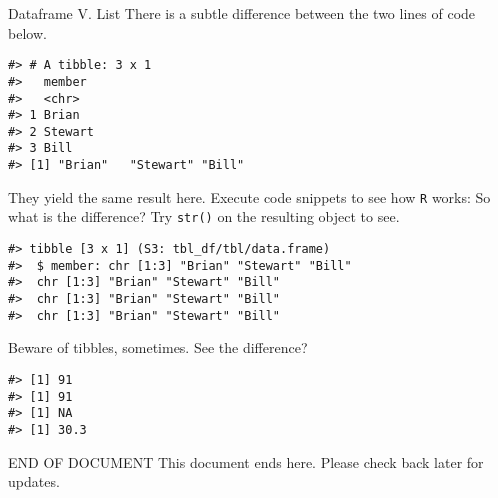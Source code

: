 \documentclass[
  11pt,
  ignorenonframetext,
  svgnames, handout, t]{beamer}
\begin{document}
\begin{frame}[fragile]{Dataframe V. List}
\protect\hypertarget{dataframe-v.-list}{}
There is a subtle difference between the two lines of code below.

\footnotesize

\begin{verbatim}
#> # A tibble: 3 x 1
#>   member 
#>   <chr>  
#> 1 Brian  
#> 2 Stewart
#> 3 Bill
#> [1] "Brian"   "Stewart" "Bill"
\end{verbatim}

\normalsize

They yield the same result here. Execute code snippets to see how
\texttt{R} works: So what is the difference? Try \texttt{str()} on the
resulting object to see.

\footnotesize

\begin{verbatim}
#> tibble [3 x 1] (S3: tbl_df/tbl/data.frame)
#>  $ member: chr [1:3] "Brian" "Stewart" "Bill"
#>  chr [1:3] "Brian" "Stewart" "Bill"
#>  chr [1:3] "Brian" "Stewart" "Bill"
#>  chr [1:3] "Brian" "Stewart" "Bill"
\end{verbatim}

\normalsize

Beware of tibbles, sometimes. See the difference?

\footnotesize

\begin{verbatim}
#> [1] 91
#> [1] 91
#> [1] NA
#> [1] 30.3
\end{verbatim}

\normalsize
\end{frame}

\begin{frame}{END OF DOCUMENT}
\protect\hypertarget{end-of-document}{}
This document ends here. Please check back later for updates.
\end{frame}
\end{document}
